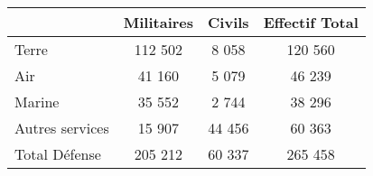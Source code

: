 \documentclass[11pt,class=book]{standalone}
\begin{document}
	\begin{tabularx}{0.8\textwidth}{X|c|c|c|}
		\cline{2-4}
		 & Militaires\cellcolor{maincolor} & Civils\cellcolor{maincolor} & Effectif Total\cellcolor{maincolor}\\
		\hline
		\multicolumn{1}{|l|}{Terre}                              & 112 502                      & 8 058                       & 120 560\\
		\hline
		\multicolumn{1}{|l|}{Air}                                & 41 160                       & 5 079                       & 46 239\\
		\hline
		\multicolumn{1}{|l|}{Marine}                             & 35 552                       & 2 744                       & 38 296\\
		\hline
		\multicolumn{1}{|l|}{Autres services}                    & 15 907                       & 44 456                      & 60 363\\
		\hline
		\multicolumn{1}{|l|}{Total Défense\cellcolor{maincolor}} & 205 212\cellcolor{maincolor} & 60 337\cellcolor{maincolor} & 265 458\cellcolor{maincolor}\\
		\hline
	\end{tabularx}
\end{document}

